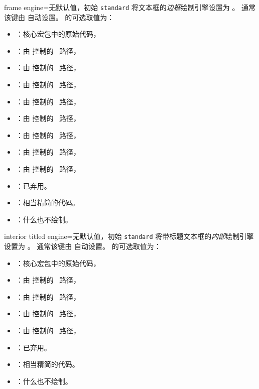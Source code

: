 \begin{docTcbKey}{frame engine}{=}{无默认值，初始 \texttt{standard}}
  将文本框的\emph{边框}绘制引擎设置为 。
  通常该键由  自动设置。
   的可选取值为：
  \begin{itemize}
  \item{}：核心宏包中的原始代码，
  \item{}：由  控制的 \tikzname\ 路径，
  \item{}：由  控制的 \tikzname\ 路径，
  \item{}：由  控制的 \tikzname\ 路径，
  \item{}：由  控制的 \tikzname\ 路径，
  \item{}：由  控制的 \tikzname\ 路径，
  \item{}：由  控制的 \tikzname\ 路径，
  \item{}：由  控制的 \tikzname\ 路径，
  \item{}：由  控制的 \tikzname\ 路径，
  \item{}：已弃用。
  \item{}：相当精简的代码。
  \item{}：什么也不绘制。
\end{itemize}
\end{docTcbKey}

\begin{docTcbKey}{interior titled engine}{=}{无默认值，初始 \texttt{standard}}
  将带标题文本框的\emph{内部}绘制引擎设置为 。
  通常该键由  自动设置。
   的可选取值为：
  \begin{itemize}
  \item{}：核心宏包中的原始代码，
  \item{}：由  控制的 \tikzname\ 路径，
  \item{}：由  控制的 \tikzname\ 路径，
  \item{}：由  控制的 \tikzname\ 路径，
  \item{}：由  控制的 \tikzname\ 路径，
  \item{}：已弃用。
  \item{}：相当精简的代码。
  \item{}：什么也不绘制。
  \end{itemize}
\end{docTcbKey}

